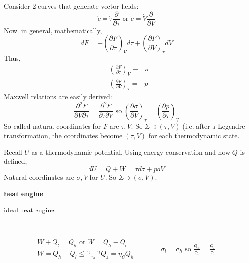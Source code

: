 \documentclass[twoside]{amsart}
\theoremstyle{plain}
\theoremstyle{definition}
\begin{document}
Consider 2 curves that generate vector fields: 
\[
\dot{c} = \dot{\tau} \frac{ \partial }{ \partial \tau } \text{ or } \dot{c} = \dot{V} \frac{ \partial }{ \partial V}
\]
Now, in general, mathematically,
\[
dF = + \left( \frac{ \partial F}{ \partial \tau } \right)_V d\tau + \left( \frac{ \partial F}{ \partial V} \right)_{\tau} dV
\]
Thus,
\[
\begin{aligned}
  & \left( \frac{ \partial F}{ \partial \tau} \right)_V = -\sigma \\ 
  & \left( \frac{ \partial F}{ \partial V} \right)_{\tau} = -p 
\end{aligned}
\]
Maxwell relations are easily derived:
\[
\frac{ \partial^2 F}{ \partial V \partial \tau} = \frac{ \partial^2 F}{ \partial \tau \partial V} \text{ so } \left( \frac{ \partial \sigma }{ \partial V} \right)_{\tau} = \left( \frac{ \partial p }{ \partial \tau} \right)_V
\]
So-called natural coordinates for $F$ are $\tau,V$.  So $\Sigma \ni (\tau,V)$ (i.e. after a Legendre transformation, the coordinates become $(\tau,V)$ for each thermodynamic state.  

Recall $U$ as a thermodynamic potential.  Using energy conservation and how $Q$ is defined, 
\[
dU = Q + W = \tau d\sigma +  pdV
\]
Natural coordinates are $\sigma, V$ for $U$.  So $\Sigma \ni (\sigma, V)$.  


\textbf{heat engine}

ideal heat engine: 

 \quad \quad \, 
\[
\begin{gathered}
W+ Q_l = Q_h \text{ or } W=Q_h - Q_l \\
W = Q_h - Q_l \leq \frac{ \tau_h - \tau_l}{ \tau_h} Q_h = \eta_C Q_h
\end{gathered} \quad \quad \quad \, 
\begin{gathered}
  \sigma_l = \sigma_h \text{ so } \frac{ Q_h}{\tau_h } = \frac{ Q_l }{ \tau_l}
\end{gathered}
\]
\end{document}
